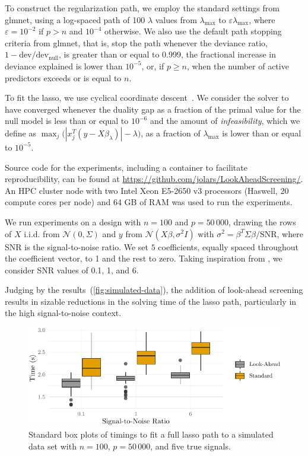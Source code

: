 \documentclass[b5paper,10pt,abstractoff,DIV=calc,headings=normal,twoside]{scrartcl}
\theoremstyle{plain}
\theoremstyle{definition}
\theoremstyle{remark}
\begin{document}
To construct
the regularization path, we employ the standard settings from \textsf{glmnet},
using a log-spaced path of 100 \(\lambda\) values from \(\lambda_\text{max}\)
to \(\varepsilon \lambda_\text{max}\), where \(\varepsilon = 10^{-2}\) if
\(p > n\) and \(10^{-4}\) otherwise. We also use the default
path stopping criteria from \textsf{glmnet}, that is, stop the path whenever
the deviance ratio, \(1 - \text{dev}/\text{dev}_\text{null}\),
is greater than or equal to 0.999,
the fractional increase in deviance explained is lower than
\(10^{-5}\), or, if \(p \geq n\),
when the number of active predictors exceeds or is equal to
\(n\).

To fit the lasso, we
use cyclical coordinate descent~\cite{friedman2010}.
We consider the solver to have converged whenever
the duality gap as a fraction of the primal value
for the null model is less than or equal to \(10^{-6}\) and the amount of
\emph{infeasibility}, which we define as
\(\max_j\big( |x_j^T(y - X\beta_\lambda)| -\lambda\big)\), as a
fraction of \(\lambda_\text{max}\) is lower than or
equal to \(10^{-5}\).

Source code for the experiments, including a container to facilitate
reproducibility, can be found at
\url{https://github.com/jolars/LookAheadScreening/}. An HPC
cluster node with two Intel Xeon E5-2650 v3 processors (Haswell, 20 compute
cores per node) and 64 GB of RAM was used to run the experiments.

We run experiments on a design with \(n = 100\) and \(p = 50\,000\),
drawing the rows of \(X\) i.i.d. from \(\mathcal{N}(0, \Sigma)\) and \(y\)
from \(\mathcal{N}(X\beta, \sigma^2I)\) with \(\sigma^2 =
\beta^T\Sigma\beta/\text{SNR}\), where SNR is the signal-to-noise ratio.  We set
\(5\) coefficients, equally spaced throughout the coefficient vector, to 1 and
the rest to zero. Taking inspiration from \citet{hastie2020}, we
consider SNR values of 0.1, 1, and 6.

Judging by the results~(\autoref{fig:simulated-data}), the addition of
look-ahead screening results in sizable reductions in the solving time of
the lasso path, particularly in the high signal-to-noise context.

\begin{figure}[hbtp]
  \centering
  \includegraphics{figures/simulated-data-timings.pdf}
  \caption{Standard box plots of timings to fit a full lasso path to
    a simulated data set with \(n = 100\), \(p = 50\,000\), and five true
    signals.}
  \label{fig:simulated-data}
\end{figure}
\end{document}
